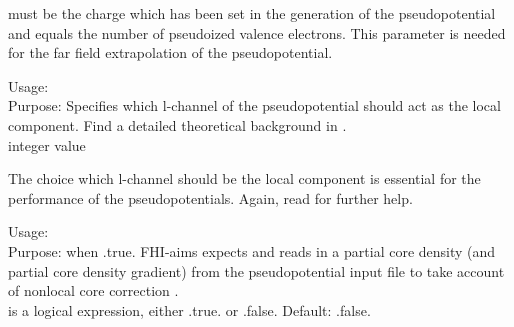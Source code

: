   must be the charge which has been
 set in the generation of the pseudopotential and equals the number of
 pseudoized valence electrons.  This parameter is needed for the far
 field extrapolation of the pseudopotential.


{
  \noindent
  Usage:   \\[1.0ex]
  Purpose: Specifies which l-channel of the pseudopotential should act as the local component.
Find a detailed theoretical background in \cite{FuchsFHI98PP}. \\[1.0ex]
   integer value\\
}

The choice which l-channel should be the local component is essential for the performance 
of the pseudopotentials. Again, read \cite{FuchsFHI98PP} for further help.


{
  \noindent
  Usage:   \\[1.0ex]
  Purpose: when .true. FHI-aims expects and reads in a partial core density (and partial core density gradient)
 from the pseudopotential input file to take account of nonlocal core correction \cite{Louie1982}. \\[1.0ex]
   is a logical expression, either .true. or .false. Default: .false.\\
}

